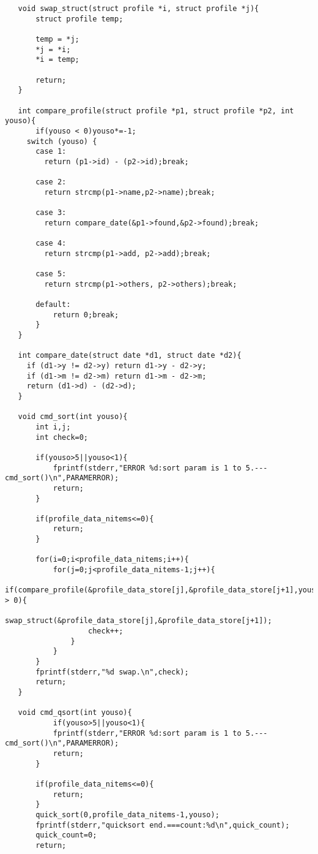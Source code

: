 \documentclass[a4j,11pt]{jarticle}
\begin{document}
\begin{lstlisting}
   void swap_struct(struct profile *i, struct profile *j){
       struct profile temp;
       
       temp = *j;
       *j = *i;
       *i = temp;
       
       return;
   }
   
   int compare_profile(struct profile *p1, struct profile *p2, int youso){
       if(youso < 0)youso*=-1;
     switch (youso) {
       case 1:
         return (p1->id) - (p2->id);break;
   
       case 2:
         return strcmp(p1->name,p2->name);break;
         
       case 3:
         return compare_date(&p1->found,&p2->found);break;
   
       case 4:
         return strcmp(p1->add, p2->add);break;
   
       case 5:
         return strcmp(p1->others, p2->others);break;
       
       default:
           return 0;break;
       }
   }
   
   int compare_date(struct date *d1, struct date *d2){
     if (d1->y != d2->y) return d1->y - d2->y;
     if (d1->m != d2->m) return d1->m - d2->m;
     return (d1->d) - (d2->d);
   }
   
   void cmd_sort(int youso){
       int i,j;
       int check=0;
   
       if(youso>5||youso<1){
           fprintf(stderr,"ERROR %d:sort param is 1 to 5.---cmd_sort()\n",PARAMERROR);
           return;
       }
       
       if(profile_data_nitems<=0){
           return;
       }
   
       for(i=0;i<profile_data_nitems;i++){
           for(j=0;j<profile_data_nitems-1;j++){
               if(compare_profile(&profile_data_store[j],&profile_data_store[j+1],youso) > 0){
                   swap_struct(&profile_data_store[j],&profile_data_store[j+1]);
                   check++;
               }
           }
       }
       fprintf(stderr,"%d swap.\n",check);
       return;
   }
   
   void cmd_qsort(int youso){
           if(youso>5||youso<1){
           fprintf(stderr,"ERROR %d:sort param is 1 to 5.---cmd_sort()\n",PARAMERROR);
           return;
       }
       
       if(profile_data_nitems<=0){
           return;
       }
       quick_sort(0,profile_data_nitems-1,youso);
       fprintf(stderr,"quicksort end.===count:%d\n",quick_count);
       quick_count=0;
       return;
       

\end{lstlisting}
\end{document}
